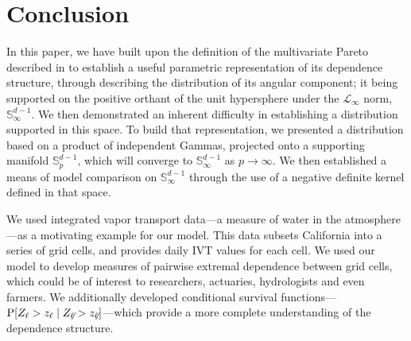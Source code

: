 \section{Conclusion\label{sec:conclusion}}
In this paper, we have built upon the definition of the multivariate Pareto described in \cite{ferreira2014}
  to establish a useful parametric representation of its dependence structure, through describing
  the distribution of its angular component; it being supported on the positive orthant of the unit
  hypersphere under the $\mathcal{L}_{\infty}$ norm, ${\mathbb S}_{\infty}^{d-1}$.  We then demonstrated an
  inherent difficulty in establishing a distribution supported in this space.  To build that representation,
  we presented a distribution based on a product of independent Gammas, projected onto a supporting manifold
  ${\mathbb S}_{p}^{d-1}$, which will converge to ${\mathbb S}_{\infty}^{d-1}$ as $p\to\infty$.  We then
  established a means of model comparison on ${\mathbb S}_{\infty}^{d-1}$ through the use of a negative
  definite kernel defined in that space.

We used integrated vapor transport data---a measure of water in the atmosphere---as a motivating example for
  our model.  This data subsets California into a series of grid cells, and provides daily IVT values for
  each cell.  We used our model to develop measures of pairwise extremal dependence between grid cells, which
  could be of interest to researchers, actuaries, hydrologists and even farmers.  We additionally developed
  conditional survival functions---$\text{P}\left[Z_{\ell} > z_{\ell}\mid Z_{\not\ell} > z_{\not\ell}\right]$---which
  provide a more complete understanding of the dependence structure.
